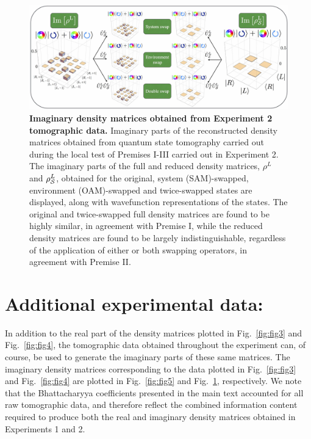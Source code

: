 \documentclass[12pt]{iopart}
\begin{document}
\begin{figure}[t]
	\centering
	\includegraphics[width=\columnwidth]{fig6.jpg}
	\caption{{\bf Imaginary density matrices obtained from Experiment 2 tomographic data.} Imaginary parts of the reconstructed density matrices obtained from quantum state tomography carried out during the local test of Premises I-III carried out in Experiment 2. The imaginary parts of the full and reduced density matrices, $\rho^{L}$ and $\rho^{L}_{\cal S}$, obtained for the original, system (SAM)-swapped, environment (OAM)-swapped and twice-swapped states are displayed, along with wavefunction representations of the states. The original and twice-swapped full density matrices are found to be highly similar, in agreement with Premise I, while the reduced density matrices are found to be largely indistinguishable, regardless of the application of either or both swapping operators, in agreement with Premise II.}%
	\label{fig:fig6}
\end{figure}

\section{Additional experimental data:}
In addition to the real part of the density matrices plotted in Fig.~\ref{fig:fig3} and Fig.~\ref{fig:fig4}, the tomographic data obtained throughout the experiment can, of course, be used to generate the imaginary parts of these same matrices. The imaginary density matrices corresponding to the data plotted in Fig.~\ref{fig:fig3} and Fig.~\ref{fig:fig4} are plotted in Fig.~\ref{fig:fig5} and Fig.~\ref{fig:fig6}, respectively. We note that the Bhattacharyya coefficients presented in the main text accounted for all raw tomographic data, and therefore reflect the combined information content required to produce both the real and imaginary density matrices obtained in Experiments 1 and 2. 
\end{document}
